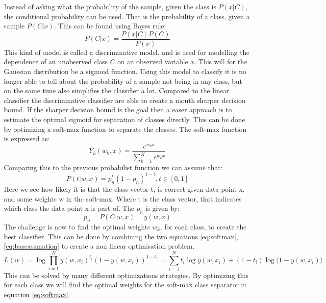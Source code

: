 Instead of asking what the probability of the sample, given the class is $P(x|C)$, the conditional probability can be used. That is the probability of a class, given a sample $P(C|x)$. This can be found using Bayes rule:
\begin{equation}
 P(C|x)=\frac{P(x|C)P(C)}{P(x)}
\end{equation}
This kind of model is called a discriminative model, and is used for modelling the dependence of an unobserved class $C$ on an observed variable $x$. This will for the Gaussian distribution be a sigmoid function. Using this model to classify it is no longer able to tell about the probability of a sample not being in any class, but on the same time also simplifies the classifier a lot. Compared to the linear classifier the discriminative classifier are able to create a mouth sharper decision bound. If the sharper decision bound is the goal then a easer approach is to estimate the optimal sigmoid for separation of classes directly. This can be done by optimizing a soft-max function to separate the classes. The soft-max function is expressed as: 
\begin{equation}
\label{eq:softmax}
 Y_k(w_k,x)=\frac{e^{w_k x}}{\sum\limits_{k=1}^K e^{w_k x}}
\end{equation}
Comparing this to the previous probabilist function we can assume that:
\begin{equation}
\label{eq:baseassmution}
 P(t|w,x) = p_n^t (1-p_n)^{1-t} , t \in [0,1] 
\end{equation}
Here we see how likely it is that the class vector t, is correct given data point x, and some weights w in the soft-max.  Where t is the class vector, that indicates which class the data point x is part of.  The $p_n$ is given by: 
\begin{equation}
 p_n = P(C| w, x) = y(w,x)
\end{equation}
The challenge is now to find the optimal weights $w_k$, for each class, to create the best classifier. This can be done by combining the two equations \ref{eq:softmax}, \ref{eq:baseassmution} to create a non linear optimisation problem.
\begin{equation}
 L(w) = \log{\prod\limits_{i=1}^N y(w,x_i)^{t_i} ( 1-y(w,x_i))^{1-t_1}}
 = \sum\limits_{i=1}^N t_i\log{y(w,x_i)}+(1-t_i)\log({1-y(w,x_i))}
\end{equation}
This can be solved by many different optimizations strategies. By optimizing this for each class we will find the optimal weights for the soft-max class separator in equation \ref{eq:softmax}.\\

